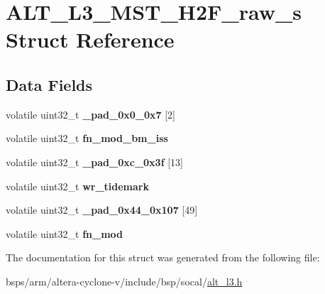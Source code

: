 \hypertarget{structALT__L3__MST__H2F__raw__s}{}\section{A\+L\+T\+\_\+\+L3\+\_\+\+M\+S\+T\+\_\+\+H2\+F\+\_\+raw\+\_\+s Struct Reference}
\label{structALT__L3__MST__H2F__raw__s}
\subsection*{Data Fields}
\begin{DoxyCompactItemize}
\item 
\mbox{\label{structALT__L3__MST__H2F__raw__s_a4ecbb44ddd566cc95a633cf87634f541}} 
volatile uint32\+\_\+t {\bfseries \+\_\+pad\+\_\+0x0\+\_\+0x7} \mbox{[}2\mbox{]}
\item 
\mbox{\label{structALT__L3__MST__H2F__raw__s_a3c92b86069531510e0a40af9d5ae72a3}} 
volatile uint32\+\_\+t {\bfseries fn\+\_\+mod\+\_\+bm\+\_\+iss}
\item 
\mbox{\label{structALT__L3__MST__H2F__raw__s_a9711ae43b54b4b90125049cbe2b08b4c}} 
volatile uint32\+\_\+t {\bfseries \+\_\+pad\+\_\+0xc\+\_\+0x3f} \mbox{[}13\mbox{]}
\item 
\mbox{\label{structALT__L3__MST__H2F__raw__s_a929cf2684dae34afc1858e22955a2088}} 
volatile uint32\+\_\+t {\bfseries wr\+\_\+tidemark}
\item 
\mbox{\label{structALT__L3__MST__H2F__raw__s_a40ffe03e658fd9294e274207f0e50217}} 
volatile uint32\+\_\+t {\bfseries \+\_\+pad\+\_\+0x44\+\_\+0x107} \mbox{[}49\mbox{]}
\item 
\mbox{\label{structALT__L3__MST__H2F__raw__s_aa356f4baf022ba4f7e1e943c145b4a77}} 
volatile uint32\+\_\+t {\bfseries fn\+\_\+mod}
\end{DoxyCompactItemize}


The documentation for this struct was generated from the following file\+:\begin{DoxyCompactItemize}
\item 
bsps/arm/altera-\/cyclone-\/v/include/bsp/socal/\mbox{\hyperlink{alt__l3_8h}{alt\+\_\+l3.\+h}}\end{DoxyCompactItemize}
